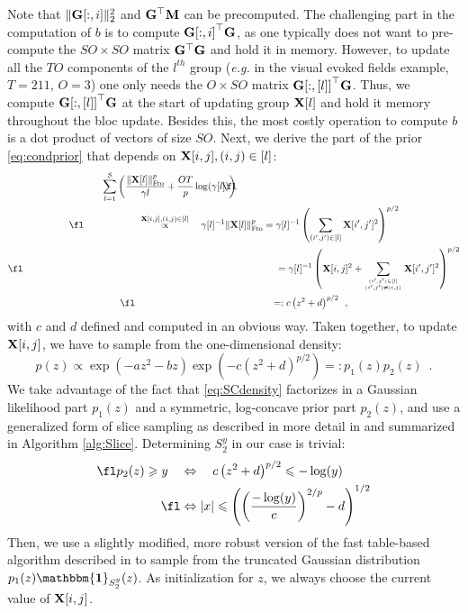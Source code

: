 Note that $\|{\mathbf{G}[:,i]}\|_2^2 $ and $\mathbf{G}^\top \mathbf{M}$ can be precomputed. The challenging part in the computation of $b$ is to compute ${\mathbf{G}[:,i]}^\top \mathbf{G}$, as one typically does not want to pre-compute the $SO \times SO$ matrix $\mathbf{G}^\top \mathbf{G}$ and hold it in memory. However, to update all the $TO$ components of the $l^{th}$ group (\textit{e.g.} in the visual evoked fields example, $T = 211$, $O = 3$) one only needs the $O \times SO$ matrix ${\mathbf{G}[:,[l]]}^\top \mathbf{G}$. Thus, we compute ${\mathbf{G}[:,[l]]}^\top \mathbf{G}$ at the start of updating group $\mathbf{X}[l]$ and hold it memory throughout the bloc update. Besides this, the most costly operation to compute $b$ is a dot product of vectors of size $SO$. Next, we derive the part of the prior \eqref{eq:condprior} that depends on $\mathbf{X}[i,j], (i,j) \in [l]$:
\begin{gather*}
\fl \hspace{-5cm} \sum_{l=1}^S \left( \frac{\fronorm{\bfX[l]}^p}{\mathbf{\gamma}{l}} + \frac{O T}{p} \log(\mathbf{\gamma}[l])\right) \quad \\
\fl \hspace{2cm} \proptoab{\bfX[i,j], (i,j) \in [l]} \quad \mathbf{\gamma}[l]^{-1} \fronorm{\bfX[l]}^p =  \mathbf{\gamma}[l]^{-1} \left( \sum_{(i',j') \in [l]} \bfX[i',j']^2  \right)^{p/2}  \nonumber \\
\fl \hspace{9.3cm} = \mathbf{\gamma}[l]^{-1} \left(\bfX[i,j]^2 + \sum_{(i',j') \in [l] \atop (i',j') \neq (i,j)} \bfX[i',j']^2  \right)^{p/2} \\
\fl \hspace{5cm} =: c \left(z^2 + d \right)^{p/2} \enspace ,
\end{gather*}
with $c$ and $d$ defined and computed in an obvious way. Taken together, to update $\mathbf{X}[i,j]$, we have to sample from the one-dimensional density:
\begin{equation}
p(z) \propto \exp \left(- a z^2 - b z \right) \exp \left(- c \left(z^2 + d \right)^{p/2} \right) =: p_1(z) p_2(z) \enspace . \label{eq:SCdensity}
\end{equation}
We take advantage of the fact that \eqref{eq:SCdensity} factorizes in a Gaussian likelihood part $p_1(z)$ and a symmetric, log-concave prior part $p_2(z)$, and use a generalized form of slice sampling \cite{Ne03,RoCa05} as described in more detail in \cite{Lu16} and summarized in Algorithm \ref{alg:Slice}. Determining $S_2^y$ in our case is trivial:
\begin{align}
\fl p_2(z) \geqslant y \quad & \Leftrightarrow \quad c \left(z^2 + d \right)^{p/2} \leqslant - \log(y) \quad \\
\fl & \Leftrightarrow |x| \leqslant \left( \left( \frac{- \log(y)}{c} \right)^{2/p} - d \right)^{1/2}
\end{align}
Then, we use a slightly modified, more robust version of the fast table-based algorithm described in \cite{Ch12} to sample from the truncated Gaussian distribution $p_1(z) \mathbf{\mathbbm{1}}_{S^y_2}(z)$. As initialization for $z$, we always choose the current value of $\mathbf{X}[i,j]$.

